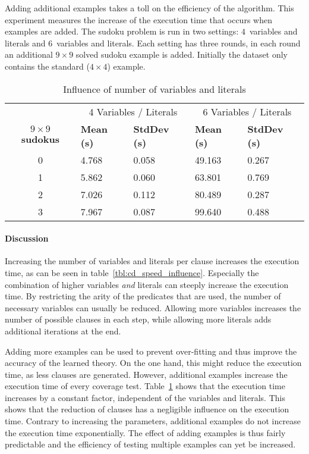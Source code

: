 \begin{experiment}
	Adding additional examples takes a toll on the efficiency of the algorithm.
	This experiment measures the increase of the execution time that occurs when examples are added.
	The sudoku problem is run in two settings: $4$~variables and literals and $6$~variables and literals.
	Each setting has three rounds, in each round an additional $9 \times 9$ solved sudoku example is added.
	Initially the dataset only contains the standard ($4 \times 4$) example.

	\begin{table}[!htp]
		\begin{tabularx}{\textwidth}{c|XX|XX}
			& \multicolumn{2}{c}{4 Variables / Literals} & \multicolumn{2}{c}{6 Variables / Literals} \\
			\textbf{$9 \times 9$ sudokus}	& \textbf{Mean (s)} & \textbf{StdDev (s)} & \textbf{Mean (s)} & \textbf{StdDev (s)} \\
			\toprule
			0 & 4.768 & 0.058	& 49.163	& 0.267	\\
			1 & 5.862 & 0.060	& 63.801	& 0.769	\\
			2 & 7.026 & 0.112	& 80.489	& 0.287	\\
			3 & 7.967 & 0.087	& 99.640	& 0.488	\\
		\end{tabularx}
		\caption{Influence of number of variables and literals}
		\label{tbl:cd_speed_examples}
	\end{table}
\end{experiment}

\paragraph{Discussion}
Increasing the number of variables and literals per clause increases the execution time, as can be seen in table~\ref{tbl:cd_speed_influence}.
Especially the combination of higher variables \emph{and} literals can steeply increase the execution time.
By restricting the arity of the predicates that are used, the number of necessary variables can usually be reduced.
Allowing more variables increases the number of possible clauses in each step, while allowing more literals adds additional iterations at the end.

Adding more examples can be used to prevent over-fitting and thus improve the accuracy of the learned theory.
On the one hand, this might reduce the execution time, as less clauses are generated.
However, additional examples increase the execution time of every coverage test.
Table~\ref{tbl:cd_speed_examples} shows that the execution time increases by a constant factor, independent of the variables and literals.
This shows that the reduction of clauses has a negligible influence on the execution time.
Contrary to increasing the parameters, additional examples do not increase the execution time exponentially.
The effect of adding examples is thus fairly predictable and the efficiency of testing multiple examples can yet be increased.

